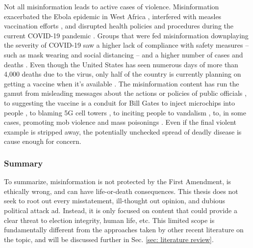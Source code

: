\documentclass[preprint,review,12pt]{elsarticle}
\begin{document}
Not all misinformation leads to active cases of violence. Misinformation exacerbated the Ebola epidemic in West Africa \cite{shultz2016role}, interfered with measles vaccination efforts \cite{hussain2018anti}, and disrupted health policies and procedures during the current COVID-19 pandemic \cite{bagherpour2020covid,world2020novel,zarocostas2020fight,depoux2020pandemic,habersaat2020ten,van2020using}. Groups that were fed misinformation downplaying the severity of COVID-19 saw a higher lack of compliance with safety measures -- such as mask wearing and social distancing -- and a higher number of cases and deaths \cite{bursztyn2020misinformation}. Even though the United States has seen numerous days of more than 4,000 deaths due to the virus, only half of the country is currently planning on getting a vaccine when it's available \cite{cornwall2020just}. The misinformation content has run the gamut from misleading messages about the actions or policies of public officials \cite{brennen2020types}, to suggesting the vaccine is a conduit for Bill Gates to inject microchips into people \cite{sanders2020difference}, to blaming 5G cell towers \cite{jolley2020pylons,goodman2020coronavirus}, to inciting people to vandalism \cite{spring2020coronavirus}, to, in some cases, promoting mob violence and mass poisonings \cite{depoux2020pandemic}. Even if the final violent example is stripped away, the potentially unchecked spread of deadly disease is cause enough for concern. 

\subsubsection{Summary}
\label{misinformation summary}
To summarize, misinformation is not protected by the First Amendment, is ethically wrong, and can have life-or-death consequences. This thesis does not seek to root out every misstatement, ill-thought out opinion, and dubious political attack ad. Instead, it is only focused on content that could provide a clear threat to election integrity, human life, etc. This limited scope is fundamentally different from the approaches taken by other recent literature on the topic, and will be discussed further in Sec. \ref{sec: literature review}.
\end{document}
